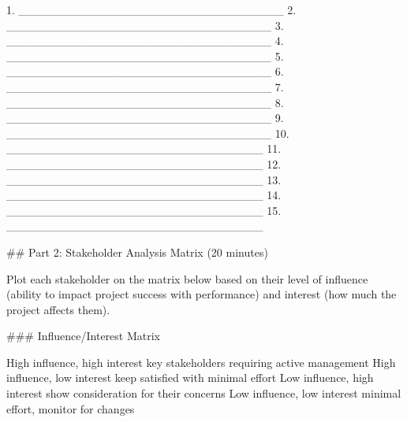 \documentclass[letterpaper,10pt,english]{sphinxmanual}
\begin{document}
\sphinxAtStartPar
{}
1. \_\_\_\_\_\_\_\_\_\_\_\_\_\_\_\_\_\_\_\_\_\_\_\_\_\_\_\_\_\_\_\_
2. \_\_\_\_\_\_\_\_\_\_\_\_\_\_\_\_\_\_\_\_\_\_\_\_\_\_\_\_\_\_\_\_
3. \_\_\_\_\_\_\_\_\_\_\_\_\_\_\_\_\_\_\_\_\_\_\_\_\_\_\_\_\_\_\_\_
4. \_\_\_\_\_\_\_\_\_\_\_\_\_\_\_\_\_\_\_\_\_\_\_\_\_\_\_\_\_\_\_\_
5. \_\_\_\_\_\_\_\_\_\_\_\_\_\_\_\_\_\_\_\_\_\_\_\_\_\_\_\_\_\_\_\_
6. \_\_\_\_\_\_\_\_\_\_\_\_\_\_\_\_\_\_\_\_\_\_\_\_\_\_\_\_\_\_\_\_
7. \_\_\_\_\_\_\_\_\_\_\_\_\_\_\_\_\_\_\_\_\_\_\_\_\_\_\_\_\_\_\_\_
8. \_\_\_\_\_\_\_\_\_\_\_\_\_\_\_\_\_\_\_\_\_\_\_\_\_\_\_\_\_\_\_\_
9. \_\_\_\_\_\_\_\_\_\_\_\_\_\_\_\_\_\_\_\_\_\_\_\_\_\_\_\_\_\_\_\_
10. \_\_\_\_\_\_\_\_\_\_\_\_\_\_\_\_\_\_\_\_\_\_\_\_\_\_\_\_\_\_\_
11. \_\_\_\_\_\_\_\_\_\_\_\_\_\_\_\_\_\_\_\_\_\_\_\_\_\_\_\_\_\_\_
12. \_\_\_\_\_\_\_\_\_\_\_\_\_\_\_\_\_\_\_\_\_\_\_\_\_\_\_\_\_\_\_
13. \_\_\_\_\_\_\_\_\_\_\_\_\_\_\_\_\_\_\_\_\_\_\_\_\_\_\_\_\_\_\_
14. \_\_\_\_\_\_\_\_\_\_\_\_\_\_\_\_\_\_\_\_\_\_\_\_\_\_\_\_\_\_\_
15. \_\_\_\_\_\_\_\_\_\_\_\_\_\_\_\_\_\_\_\_\_\_\_\_\_\_\_\_\_\_\_

\sphinxAtStartPar
{}

\sphinxAtStartPar
\#\# Part 2: Stakeholder Analysis Matrix (20 minutes)

\sphinxAtStartPar
{} Plot each stakeholder on the matrix below based on their level of influence (ability to impact project success with performance) and interest (how much the project affects them).

\sphinxAtStartPar
\#\#\# Influence/Interest Matrix

\sphinxAtStartPar
{}

\sphinxAtStartPar
{}
\sphinxhyphen{}  High influence, high interest \sphinxhyphen{} key stakeholders requiring active management
\sphinxhyphen{}  High influence, low interest \sphinxhyphen{} keep satisfied with minimal effort
\sphinxhyphen{}  Low influence, high interest \sphinxhyphen{} show consideration for their concerns
\sphinxhyphen{}  Low influence, low interest \sphinxhyphen{} minimal effort, monitor for changes
\end{document}
